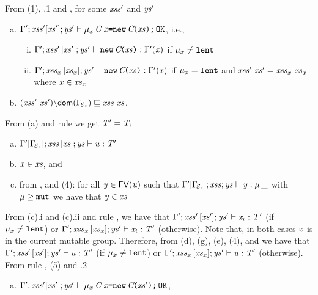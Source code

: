 From (1), .1 and , for some $\mathit{xss}'$ and $\mathit{ys}'$
\begin{enumerate} [(a)]\addtocounter{enumi}{2}
\item $\Gamma';\mathit{xss}'[\mathit{xs}'];\mathit{ys}'\vdash \mu_x\,\mathit{C}\,\mathit{x}\texttt{=}\texttt{new}\,\mathit{C}\!\texttt{(}\mathit{xs}\texttt{)}\texttt{;}\,{\tt OK}$, i.e., 
\begin{enumerate}[i.]
\item $\Gamma';\mathit{xss}'\,[\mathit{xs}'];\mathit{ys}'\vdash \texttt{new}\,\mathit{C}\!\texttt{(}\mathit{xs}\texttt{)}:\Gamma'(\mathit{x})$ if $\mu_x\not=\texttt{lent}$
\item $\Gamma';\mathit{xss}_x\,[\mathit{xs}_x];\mathit{ys}'\vdash \texttt{new}\,\mathit{C}\!\texttt{(}\mathit{xs}\texttt{)}:\Gamma'(\mathit{x})$ if $\mu_x=\texttt{lent}$ and $\mathit{xss}'\ \mathit{xs}'=\mathit{xss}_x\ \mathit{xs}_x$ where $\mathit{x}\in\mathit{xs}_x$
\end{enumerate}
\item 
 $\LessEq{(\LentLocked'\ \xs'){\setminus}\dom{\TypeEnv{\ctx_z}}}{\LentLocked\ \xs}$.
\end{enumerate}
From (a) and rule  we get $\mathit{T}'=\mathit{T}_i$
\begin{enumerate} [(a)]\addtocounter{enumi}{4}
\item $\Gamma'[\Gamma_{\!{\cal{E}}_z}];\mathit{xss}\,[\mathit{xs}];\mathit{ys}\vdash {{\mathit{u}}}:\mathit{T}'$
\item $\mathit{x}\in\mathit{xs}$, and
\item  from ,  and (4): for all
$\mathit{y}\in\textsf{FV}(\mathit{u})$ such that $\Gamma'[\Gamma_{\!{\cal{E}}_z}];\mathit{xss};\mathit{ys}\vdash \mathit{y}:\mu\,\_$ with $\mu\geq\texttt{mut}$ we have that $\mathit{y}\in\mathit{xs}$
\end{enumerate}
From (c).i and (c).ii and rule , we have that $\Gamma';\mathit{xss}'\,[\mathit{xs}'];\mathit{ys}'\vdash \mathit{x}_i:\mathit{T}'$ (if $\mu_x\not=\texttt{lent}$) or  $\Gamma';\mathit{xss}_x\,[\mathit{xs}_x];\mathit{ys}'\vdash \mathit{x}_i:\mathit{T}'$ (otherwise). 
Note that, in both cases $\mathit{x}$ is in the current mutable group. Therefore, from (d), (g),
(e), (4), and  we have that
$\Gamma';\mathit{xss}'\,[\mathit{xs}'];\mathit{ys}'\vdash \mathit{u}:\mathit{T}'$ (if $\mu_x\not=\texttt{lent}$) or  $\Gamma';\mathit{xss}_x\,[\mathit{xs}_x];\mathit{ys}'\vdash \mathit{u}:\mathit{T}'$ (otherwise).
From rule , (5) and .2 
\begin{enumerate} [(a)]\addtocounter{enumi}{7}
\item $\Gamma';\mathit{xss}'[\mathit{xs}'];\mathit{ys}'\vdash \mu_x\,\mathit{C}\,\mathit{x}\texttt{=}\texttt{new}\,\mathit{C}\!\texttt{(}\mathit{xs}'\texttt{)}\texttt{;}\,{\tt OK}$, 
\end{enumerate}

